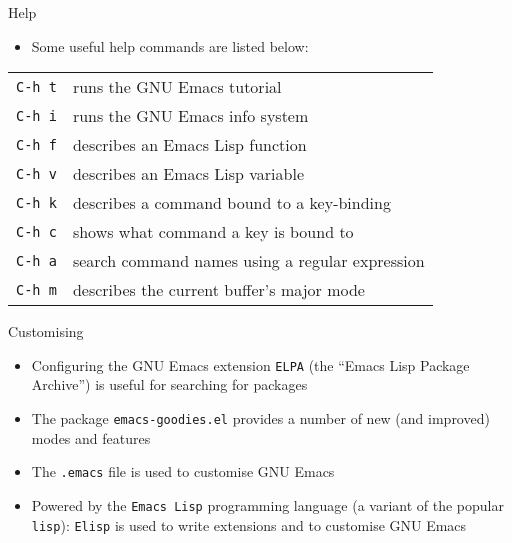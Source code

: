 \documentclass[12pt,a4paper,oneside]{beamer}
\begin{document}
\begin{frame}{Help}
\begin{itemize}
  \item Some useful help commands are listed below:
\end{itemize}
\begin{tabular}{@{}ll@{}}
  \texttt{C-h t} & runs the GNU Emacs tutorial\\
  \texttt{C-h i} & runs the GNU Emacs info system\\
  \texttt{C-h f} & describes an Emacs Lisp function\\
  \texttt{C-h v} & describes an Emacs Lisp variable\\
  \texttt{C-h k} & describes a command bound to a key-binding\\
  \texttt{C-h c} & shows what command a key is bound to\\
  \texttt{C-h a} & search command names using a regular expression\\
  \texttt{C-h m} & describes the current buffer's major mode\\
\end{tabular}
\end{frame}

\begin{frame}{Customising}
\begin{itemize}
  \item Configuring the GNU Emacs extension \texttt{ELPA} (the ``Emacs Lisp Package Archive'') is useful for searching for packages\newline
  \item The package \texttt{emacs-goodies.el} provides a number of new (and improved) modes and features\newline
  \item The \texttt{.emacs} file is used to customise GNU Emacs\newline
  \item Powered by the \texttt{Emacs Lisp} programming language (a variant of the popular \texttt{lisp}): \texttt{Elisp} is used to write extensions and to customise GNU Emacs
\end{itemize}
\end{frame}
\end{document}
